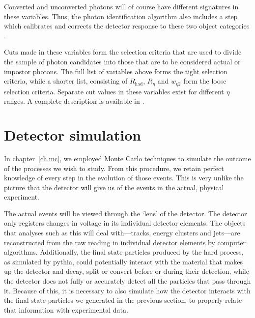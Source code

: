 Converted and unconverted photons will of course have different signatures in these variables. Thus, the photon identification algorithm also includes a step which calibrates and corrects the detector response to these two object categories \cite{phorec}.

Cuts made in these variables form the selection criteria that are used to divide the sample of photon candidates into those that are to be considered actual or impostor photons. The full list of variables above forms the tight selection criteria, while a shorter list, consisting of $R_\text{had}$, $R_\eta$ and $w_{\eta2}$ form the loose selection criteria. Separate cut values in these variables exist for different $\eta$ ranges. A complete description is available in \cite{Carminati}.

\section{Detector simulation}
In chapter~\ref{ch.mc}, we employed Monte Carlo techniques to simulate the outcome of the processes we wish to study. From this procedure, we retain perfect knowledge of every step in the evolution of those events. This is very unlike the picture that the detector will give us of the events in the actual, physical experiment.

The actual events will be viewed through the `lens' of the \atlas{} detector. The detector only registers changes in voltage in its individual detector elements. The objects that analyses such as this will deal with---tracks, energy clusters and jets---are reconstructed from the raw reading in individual detector elements by computer algorithms. Additionally, the final state particles produced by the hard process, as simulated by pythia, could potentially interact with the material that makes up the detector and decay, split or convert before or during their detection, while the detector does not fully or accurately detect all the particles that pass through it. Because of this, it is necessary to also simulate how the detector interacts with the final state particles we generated in the previous section, to properly relate that information with experimental data.

